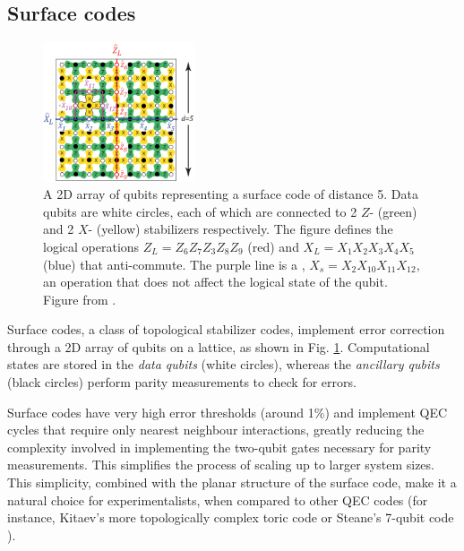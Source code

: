 \subsection{Surface codes}
\begin{figure}
  \centering
  \includegraphics[width=0.4\textwidth]{images/surface_code.png}
  \caption{A 2D array of qubits representing a surface code of distance 5. Data
    qubits are white circles, each of which are connected to 2 $Z$- (green)
    and 2 $X$- (yellow) stabilizers respectively. The figure defines the logical
    operations $Z_L = Z_6Z_7Z_3Z_8Z_9$ (red) and $X_L = X_1X_2X_3X_4X_5$ (blue)
    that anti-commute. The purple line is a ,
    $X_s = X_2 X_{10}X_{11} X_{12} $, an operation that does not affect the
    logical state of the qubit. Figure from \cite{fowler12_surfac_codes}.}
  \label{fig:surface_code}
\end{figure}

Surface codes, a class of topological stabilizer codes, implement error
correction through a 2D array of qubits on a lattice, as shown in Fig.
\ref{fig:surface_code}. Computational states are stored in the \textit{data
  qubits} (white circles), whereas the \textit{ancillary qubits} (black circles)
perform parity measurements to check for errors. 

Surface codes have very high error thresholds (around 1\%) \cite{terhal15} and
implement QEC cycles that require only nearest neighbour interactions, greatly
reducing the complexity involved in implementing the two-qubit gates necessary
for parity measurements. This simplifies the process of scaling up to larger
system sizes. This simplicity, combined with the planar structure of the surface
code, make it a natural choice for experimentalists, when compared to other QEC
codes (for instance, Kitaev's more topologically complex toric code
\cite{Kitaev_2003} or Steane's 7-qubit code \cite{Steane_1996_QEC}).


